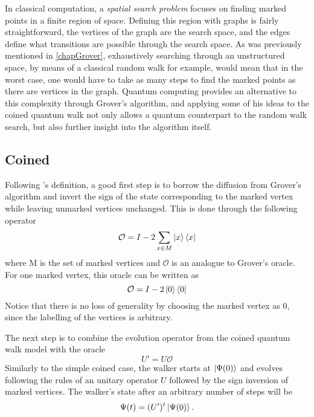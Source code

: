 \documentclass[../../dissertation.tex]{subfiles}
\begin{document}
In classical computation, a \textit{spatial search problem} focuses on finding marked points in a finite region of space. Defining this region with graphs is fairly straightforward, the vertices of the graph are the search space, and the edges define what transitions are possible through the search space. As was previously mentioned in \ref{chapGrover}, exhaustively searching through an unstructured space, by means of a classical random walk for example, would mean that in the worst case, one would have to take as many steps to find the marked points as there are vertices in the graph. Quantum computing provides an alternative to this complexity through Grover's algorithm, and applying some of his ideas to the coined quantum walk not only allows a quantum counterpart to the random walk search, but also further insight into the algorithm itself.\par
\subsection{Coined} \label{sec:chap3CoinedSearch}
Following \cite{REN1}'s definition, a good first step is to borrow the diffusion from Grover's algorithm and invert the sign of the state corresponding to the marked vertex while leaving unmarked vertices unchanged. This is done through the following operator 
\begin{equation}
	\mathcal{O} = I - 2 \sum_{x\in M} \ket{x}\bra{x}
\end{equation}
where M is the set of marked vertices and $\mathcal{O}$ is an analogue to Grover's oracle. For one marked vertex, this oracle can be written as 
\begin{equation}
	\mathcal{O} = I - 2 \ket{0}\bra{0}
\end{equation}
Notice that there is no loss of generality by choosing the marked vertex as $0$, since the labelling of the vertices is arbitrary.\par
The next step is to combine the evolution operator from the coined quantum walk model with the oracle
\begin{equation}
	U'= U\mathcal{O}
	\label{eq:43}
\end{equation}
Similarly to the simple coined case, the walker starts at $\ket{\Psi(0)}$ and evolves following the rules of an unitary operator $U$ followed by the sign inversion of marked vertices. The walker's state after an arbitrary number of steps will be
\begin{equation}
	\Psi(t) = (U')^t\ket{\Psi(0)}.
	\label{eq:sysStateSearch}
\end{equation}\par
\end{document}
